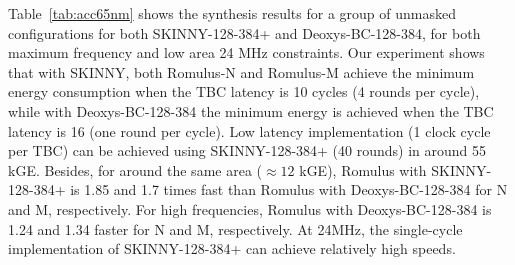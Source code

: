 \documentclass[conference]{IEEEtran}
\begin{document}
Table~\ref{tab:acc65nm} shows the synthesis results for a group of unmasked configurations for both SKINNY-128-384+ and Deoxys-BC-128-384, for both maximum frequency and low area 24 MHz constraints. Our experiment shows that with SKINNY, both Romulus-N and Romulus-M achieve the minimum energy consumption when the TBC latency is 10 cycles (4 rounds per cycle), while with Deoxys-BC-128-384 the minimum energy is achieved when the TBC latency is 16 (one round per cycle). Low latency implementation (1 clock cycle per TBC) can be achieved using SKINNY-128-384+ (40 rounds) in around 55 kGE. Besides, for around the same area ($\approx 12$ kGE), Romulus with SKINNY-128-384+ is 1.85 and 1.7 times fast than Romulus with Deoxys-BC-128-384 for N and M, respectively. For high frequencies, Romulus with Deoxys-BC-128-384 is 1.24 and 1.34 faster for N and M, respectively. At 24MHz, the single-cycle implementation of SKINNY-128-384+ can achieve relatively high speeds.
\end{document}
